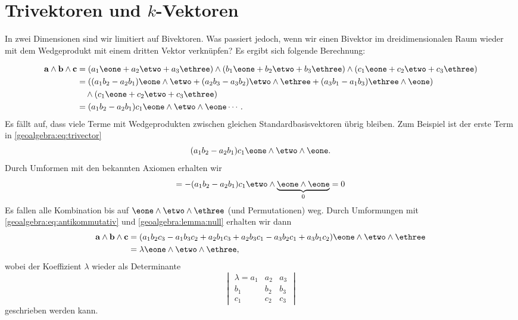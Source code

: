\section{Trivektoren und $k$-Vektoren}
\label{geoalgebra:section:trivectors-n-vectors}
In zwei Dimensionen sind wir limitiert auf Bivektoren. Was passiert jedoch, wenn wir einen Bivektor
im dreidimensionalen Raum wieder mit dem Wedgeprodukt mit einem dritten Vektor verknüpfen?
Es ergibt sich folgende Berechnung:
{
\begin{equation} 
\begin{aligned}
\a \wedge \b \wedge \c &= (a_1 \eone + a_2 \etwo + a_3 \ethree) \wedge (b_1 \eone + b_2 \etwo + b_3 \ethree) \wedge (c_1 \eone + c_2 \etwo + c_3 \ethree) \\
&= ((a_1 b_2 - a_2 b_1) \eone \wedge \etwo +(a_2 b_3 - a_3 b_2) \etwo \wedge \ethree +(a_3 b_1 - a_1 b_3) \ethree \wedge \eone) \\
&\quad\wedge (c_1 \eone + c_2 \etwo + c_3 \ethree) \\
&= (a_1 b_2 - a_2 b_1) c_1 \eone \wedge \etwo \wedge \eone \cdots.
\end{aligned}
\label{geoalgebra:eq:trivector}
\end{equation}
Es fällt auf, dass viele Terme mit Wedgeprodukten zwischen gleichen Standardbasisvektoren übrig bleiben. Zum Beispiel ist der erste Term in \eqref{geoalgebra:eq:trivector}
\begin{equation}
(a_1 b_2 - a_2 b_1) c_1 \eone \wedge \etwo \wedge \eone.
\end{equation}
Durch Umformen mit den bekannten Axiomen erhalten wir
\begin{equation}
=-(a_1 b_2 - a_2 b_1) c_1 \etwo \wedge \underbrace{\eone \wedge \eone}_{0} = 0
\end{equation}
Es fallen alle Kombination bis auf $\eone \wedge \etwo \wedge \ethree$ (und Permutationen) weg.
Durch Umformungen mit \eqref{geoalgebra:eq:antikommutativ} und
\eqref{geoalgebra:lemma:null} erhalten wir dann
\begin{equation}
  \begin{aligned}
  \a \wedge \b \wedge \c &= (a_1 b_2 c_3 - a_1 b_3 c_2 + a_2 b_1 c_3 + a_2 b_3 c_1 - a_3 b_2 c_1 + a_3 b_1 c_2) \eone \wedge \etwo \wedge \ethree \\
  &= \lambda \eone \wedge \etwo \wedge \ethree,
  \end{aligned}
\end{equation}
wobei der Koeffizient $\lambda$ wieder als Determinante
\begin{equation}
\begin{vmatrix} \lambda = a_1 & a_2 & a_3 \\ b_1 & b_2 & b_3 \\ c_1 & c_2 & c_3 \end{vmatrix}
\end{equation}
geschrieben werden kann.

}

